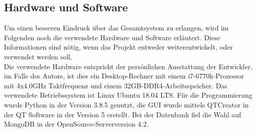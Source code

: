 \subsection{Hardware und Software}
Um einen besseren Eindruck über das Gesamtsystem zu erlangen, wird im Folgenden noch die verwendete Hardware und Software erläutert. Diese Informationen sind nötig, wenn das Projekt entweder weiterentwickelt, oder verwendet werden soll. \\
Die verwendete Hardware entspricht der persönlichen Ausstattung der Entwickler, im Falle des Autors, ist dies ein Desktop-Rechner mit einem i7-6770k-Prozessor mit 4x4.0GHz Taktfrequenz und einem 32GB-DDR4-Arbeitsspeicher. Das verwendete Betriebssystem ist Linux Ubuntu 18.04 LTS. Für die Programmierung wurde Python in der Version 3.8.5 genutzt, die GUI wurde mittels QTCreator in der QT Software in der Version 5 erstellt. Bei der Datenbank fiel die Wahl auf MongoDB in der OpenSource-Serverversion 4.2. 

